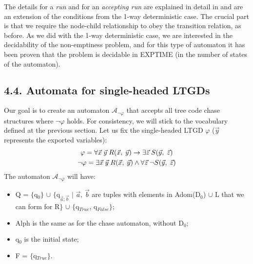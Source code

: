 \documentclass[11pt, a4paper, dvipsnames]{article}
\begin{document}
The details for a \textit{run} and for an \textit{accepting run} are explained in detail in \cite{decidable} and are an extension of the conditions from the 1-way deterministic case. The crucial part is that we require the node-child relationship to obey the transition relation, as before. As we did with the 1-way deterministic case, we are interested in the decidability of the non-emptiness problem, and for this type of automaton it has been proven that the problem is decidable in EXPTIME (in the number of states of the automaton).

\subsection{4.4. Automata for single-headed LTGDs}
Our goal is to create an automaton $\mathcal{A}_{\neg \varphi}$ that accepts all tree code chase structures where $\neg \varphi$ holds. For consistency, we will stick to the vocabulary defined at the previous section. \newline
Let us fix the single-headed LTGD $\varphi$ ($\vec{y}$ represents the exported variables):
\begin{gather*}
\varphi = \forall \vec{x} \hspace{0.25em}\vec{y} \hspace{0.25em}R(\vec{x}, \hspace{0.25em} \vec{y}) \rightarrow \exists \vec{z} \hspace{0.25em}S(\vec{y}, \hspace{0.25em}\vec{z})\\
\neg \varphi = \exists \vec{x} \hspace{0.25em} \vec{y} \hspace{0.25em} R(\vec{x}, \hspace{0.25em} \vec{y}) \wedge \forall \vec{z} \hspace{0.25em} \neg S(\vec{y}, \hspace{0.25em}\vec{z})
\end{gather*}
The automaton $\mathcal{A}_{\neg \varphi}$ will have:
\begin{itemize}
	\item Q = $\{$q$_{0}\}$ $\cup$ $\{$q$_{\vec{a};\vec{b}}$ $|$ $\vec{a}$, $\vec{b}$ are tuples with elements in Adom(D$_{0}$) $\cup$ L that we can form for R$\}$ $\cup$ $\{$q$_{True}$, q$_{False}\}$;
	\item Alph is the same as for the chase automaton, without D$_{0}$;
	\item q$_{0}$ is the initial state;
	\item F = $\{$q$_{True}\}$.
\end{itemize}
\end{document}
